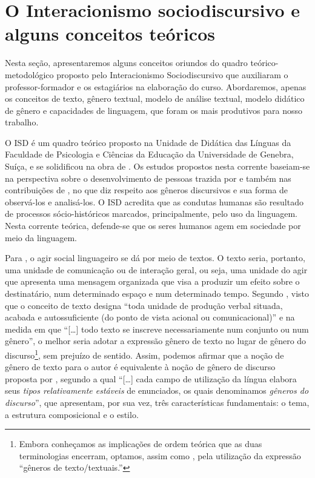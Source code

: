 \section{O Interacionismo sociodiscursivo e alguns conceitos teóricos}\label{sec-ointeracionismo}

Nesta seção, apresentaremos alguns conceitos oriundos do quadro
teórico-metodológico proposto pelo Interacionismo Sociodiscursivo que
auxiliaram o professor-formador e os estagiários na elaboração do curso.
Abordaremos, apenas os conceitos de texto, gênero textual, modelo de
análise textual, modelo didático de gênero e capacidades de linguagem,
que foram os mais produtivos para nosso trabalho.

O ISD é um quadro teórico proposto na Unidade de Didática das Línguas da
Faculdade de Psicologia e Ciências da Educação da Universidade de
Genebra, Suíça, e se solidificou na obra de \textcite{bronckart_atividade_1999}. Os
estudos propostos nesta corrente baseiam-se na perspectiva sobre o
desenvolvimento de pessoas trazida por \textcite{vygotski_pensee_1997} e também nas
contribuições de \textcite{bakhtin_estetica_2006}, no que diz respeito aos gêneros
discursivos e sua forma de observá-los e analisá-los. O ISD acredita que
as condutas humanas são resultado de processos sócio-históricos
marcados, principalmente, pelo uso da linguagem. Nesta corrente teórica,
defende-se que os seres humanos agem em sociedade por meio da linguagem.

Para \textcite{bronckart_atividade_1999}, o agir social linguageiro se dá por meio de
textos. O texto seria, portanto, uma unidade de comunicação ou de
interação geral, ou seja, uma unidade do agir que apresenta uma mensagem
organizada que visa a produzir um efeito sobre o destinatário, num
determinado espaço e num determinado tempo. Segundo \textcite[p. 78]{bronckart_atividade_1999}, visto que o conceito de texto designa \enquote{toda unidade de produção
verbal situada, acabada e autossuficiente (do ponto de vista acional ou
comunicacional)} e na medida em que \enquote{[\ldots] todo texto se inscreve
necessariamente num conjunto ou num gênero}, o melhor seria adotar a
expressão gênero de texto no lugar de gênero do discurso\footnote{Embora
	conheçamos as implicações de ordem teórica que as duas terminologias
	encerram, optamos, assim como \textcite{bronckart_atividade_1999}, pela utilização da
	expressão \enquote{gêneros de texto/textuais.}}, sem prejuízo de sentido.
Assim, podemos afirmar que a noção de gênero de texto para o autor é
equivalente à noção de gênero de discurso proposta por \textcite[p. 262, grifos do autor.]{bakhtin_estetica_2006}, segundo a qual \enquote{[\ldots] cada campo de
utilização da língua elabora seus \emph{tipos relativamente estáveis} de
enunciados, os quais denominamos \emph{gêneros do discurso}}, que
apresentam, por sua vez, três características fundamentais: o tema, a
estrutura composicional e o estilo.

